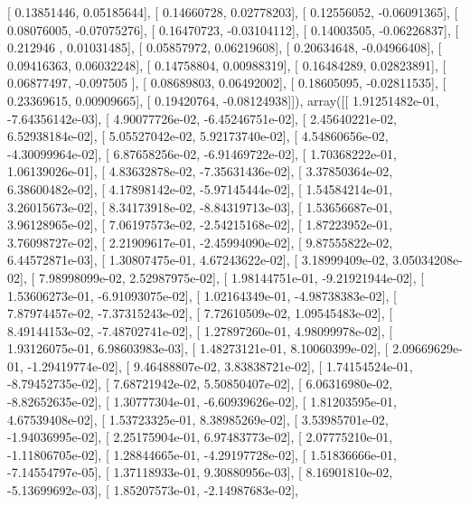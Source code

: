 \documentclass{article}
\begin{document}
       [ 0.13851446,  0.05185644],
       [ 0.14660728,  0.02778203],
       [ 0.12556052, -0.06091365],
       [ 0.08076005, -0.07075276],
       [ 0.16470723, -0.03104112],
       [ 0.14003505, -0.06226837],
       [ 0.212946  ,  0.01031485],
       [ 0.05857972,  0.06219608],
       [ 0.20634648, -0.04966408],
       [ 0.09416363,  0.06032248],
       [ 0.14758804,  0.00988319],
       [ 0.16484289,  0.02823891],
       [ 0.06877497, -0.097505  ],
       [ 0.08689803,  0.06492002],
       [ 0.18605095, -0.02811535],
       [ 0.23369615,  0.00909665],
       [ 0.19420764, -0.08124938]]), array([[  1.91251482e-01,  -7.64356142e-03],
       [  4.90077726e-02,  -6.45246751e-02],
       [  2.45640221e-02,   6.52938184e-02],
       [  5.05527042e-02,   5.92173740e-02],
       [  4.54860656e-02,  -4.30099964e-02],
       [  6.87658256e-02,  -6.91469722e-02],
       [  1.70368222e-01,   1.06139026e-01],
       [  4.83632878e-02,  -7.35631436e-02],
       [  3.37850364e-02,   6.38600482e-02],
       [  4.17898142e-02,  -5.97145444e-02],
       [  1.54584214e-01,   3.26015673e-02],
       [  8.34173918e-02,  -8.84319713e-03],
       [  1.53656687e-01,   3.96128965e-02],
       [  7.06197573e-02,  -2.54215168e-02],
       [  1.87223952e-01,   3.76098727e-02],
       [  2.21909617e-01,  -2.45994090e-02],
       [  9.87555822e-02,   6.44572871e-03],
       [  1.30807475e-01,   4.67243622e-02],
       [  3.18999409e-02,   3.05034208e-02],
       [  7.98998099e-02,   2.52987975e-02],
       [  1.98144751e-01,  -9.21921944e-02],
       [  1.53606273e-01,  -6.91093075e-02],
       [  1.02164349e-01,  -4.98738383e-02],
       [  7.87974457e-02,  -7.37315243e-02],
       [  7.72610509e-02,   1.09545483e-02],
       [  8.49144153e-02,  -7.48702741e-02],
       [  1.27897260e-01,   4.98099978e-02],
       [  1.93126075e-01,   6.98603983e-03],
       [  1.48273121e-01,   8.10060399e-02],
       [  2.09669629e-01,  -1.29419774e-02],
       [  9.46488807e-02,   3.83838721e-02],
       [  1.74154524e-01,  -8.79452735e-02],
       [  7.68721942e-02,   5.50850407e-02],
       [  6.06316980e-02,  -8.82652635e-02],
       [  1.30777304e-01,  -6.60939626e-02],
       [  1.81203595e-01,   4.67539408e-02],
       [  1.53723325e-01,   8.38985269e-02],
       [  3.53985701e-02,  -1.94036995e-02],
       [  2.25175904e-01,   6.97483773e-02],
       [  2.07775210e-01,  -1.11806705e-02],
       [  1.28844665e-01,  -4.29197728e-02],
       [  1.51836666e-01,  -7.14554797e-05],
       [  1.37118933e-01,   9.30880956e-03],
       [  8.16901810e-02,  -5.13699692e-03],
       [  1.85207573e-01,  -2.14987683e-02],
\end{document}
